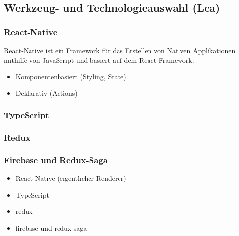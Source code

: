\subsection{Werkzeug- und Technologieauswahl (Lea)}
\subsubsection{React-Native}
React-Native ist ein Framework für das Erstellen von Nativen 
Applikationen mithilfe von JavaScript und basiert auf dem React Framework. 

\begin{itemize}
    \item Komponentenbasiert (Styling, State)
    \item Deklarativ (Actions)
    \
\end{itemize}
\subsubsection{TypeScript}
\subsubsection{Redux}
\subsubsection{Firebase und Redux-Saga}
\begin{itemize}
    \item React-Native (eigentlicher Renderer)
    \item TypeScript
    \item redux
    \item firebase und redux-saga
\end{itemize}

